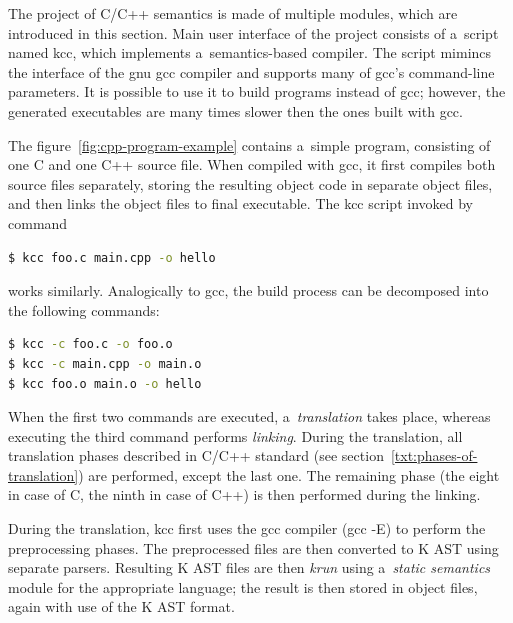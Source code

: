 \documentclass{fithesis3}
\begin{document}


The project of C/C++ semantics is made of multiple modules, which are introduced in this section. 
Main user interface of the project consists of a~script named kcc, which implements a~semantics-based compiler. The script mimincs the interface of the gnu gcc compiler and supports many of gcc's command-line parameters. It is possible to use it to build programs instead of gcc; however, the generated executables are many times slower then the ones built with gcc.

The figure~\ref{fig:cpp-program-example} contains a~simple program, consisting of one C and one C++ source file. When compiled with gcc, it first compiles both source files separately, storing the resulting object code in separate object files, and then links the object files to final executable. The kcc script invoked by command
\begin{lstlisting}[language=bash]
$ kcc foo.c main.cpp -o hello
\end{lstlisting}
works similarly. Analogically to gcc, the build process can be decomposed into the following commands:
\begin{lstlisting}[language=bash]
$ kcc -c foo.c -o foo.o
$ kcc -c main.cpp -o main.o
$ kcc foo.o main.o -o hello
\end{lstlisting}

When the first two commands are executed, a~\textit{translation} takes place, whereas executing the third command performs \textit{linking}. During the translation, all translation phases described in C/C++ standard (see section~\ref{txt:phases-of-translation}) are performed, except the last one. The remaining phase (the eight in case of C, the ninth in case of C++) is then performed during the linking.

During the translation, kcc first uses the gcc compiler (gcc -E) to perform the preprocessing phases. The preprocessed files are then converted to K AST using separate parsers. Resulting K AST files are then \textit{krun} using a~\textit{static semantics} module for the appropriate language; the result is then stored in object files, again with use of the K AST format.
\end{document}
